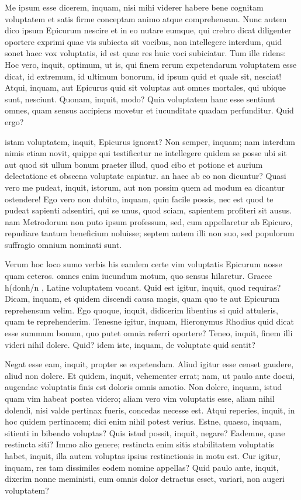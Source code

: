  Me ipsum esse dicerem, inquam, nisi mihi viderer habere bene cognitam voluptatem et satis firme conceptam animo atque comprehensam. Nunc autem dico ipsum Epicurum nescire et in eo nutare eumque, qui crebro dicat diligenter oportere exprimi quae vis subiecta sit vocibus, non intellegere interdum, quid sonet haec vox voluptatis, id est quae res huic voci subiciatur. Tum ille ridens: Hoc vero, inquit, optimum, ut is, qui finem rerum expetendarum voluptatem esse dicat, id extremum, id ultimum bonorum, id ipsum quid et quale sit, nesciat! Atqui, inquam, aut Epicurus quid sit voluptas aut omnes mortales, qui ubique sunt, nesciunt. Quonam, inquit, modo? Quia voluptatem hanc esse sentiunt omnes, quam sensus accipiens movetur et iucunditate quadam perfunditur. Quid ergo?

 istam voluptatem, inquit, Epicurus ignorat? Non semper, inquam; nam interdum nimis etiam novit, quippe qui testificetur ne intellegere quidem se posse ubi sit aut quod sit ullum bonum praeter illud, quod cibo et potione et aurium delectatione et obscena voluptate capiatur. an haec ab eo non dicuntur? Quasi vero me pudeat, inquit, istorum, aut non possim quem ad modum ea dicantur ostendere! Ego vero non dubito, inquam, quin facile possis, nec est quod te pudeat sapienti adsentiri, qui se unus, quod sciam, sapientem profiteri sit ausus. nam Metrodorum non puto ipsum professum, sed, cum appellaretur ab Epicuro, repudiare tantum beneficium noluisse; septem autem illi non suo, sed populorum suffragio omnium nominati sunt.

 Verum hoc loco sumo verbis his eandem certe vim voluptatis Epicurum nosse quam ceteros. omnes enim iucundum motum, quo sensus hilaretur. Graece h(donh/n , Latine voluptatem vocant. Quid est igitur, inquit, quod requiras? Dicam, inquam, et quidem discendi causa magis, quam quo te aut Epicurum reprehensum velim. Ego quoque, inquit, didicerim libentius si quid attuleris, quam te reprehenderim. Tenesne igitur, inquam, Hieronymus Rhodius quid dicat esse summum bonum, quo putet omnia referri oportere? Teneo, inquit, finem illi videri nihil dolere. Quid? idem iste, inquam, de voluptate quid sentit?

 Negat esse eam, inquit, propter se expetendam. Aliud igitur esse censet gaudere, aliud non dolere. Et quidem, inquit, vehementer errat; nam, ut paulo ante docui, augendae voluptatis finis est doloris omnis amotio. Non dolere, inquam, istud quam vim habeat postea videro; aliam vero vim voluptatis esse, aliam nihil dolendi, nisi valde pertinax fueris, concedas necesse est. Atqui reperies, inquit, in hoc quidem pertinacem; dici enim nihil potest verius. Estne, quaeso, inquam, sitienti in bibendo voluptas? Quis istud possit, inquit, negare? Eademne, quae restincta siti? Immo alio genere; restincta enim sitis stabilitatem voluptatis habet, inquit, illa autem voluptas ipsius restinctionis in motu est. Cur igitur, inquam, res tam dissimiles eodem nomine appellas? Quid paulo ante, inquit, dixerim nonne meministi, cum omnis dolor detractus esset, variari, non augeri voluptatem?

